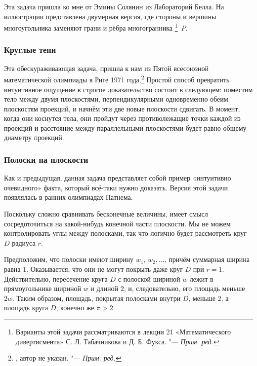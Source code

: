 \documentclass[twoside]{book}
\begin{document}
Эта задача пришла ко мне от Эмины Солянин %
из Лабораторий Белла.
На иллюстрации представлена двумерная версия, где стороны и вершины многоугольника заменяют грани и рёбра многогранника%
\footnote{Варианты этой задачи рассматриваются в лекции 21 «Математического дивертисмента» С. Л. Табачникова и Д. Б. Фукса. "--- \emph{Прим. ред.}}~$P$.

\subsubsection*{Круглые тени}%

Эта обескураживающая задача, пришла к нам из Пятой всесоюзной математической олимпиады в Риге 1971 года.\footnote{\cite[№150]{ВсМО}, автор не указан. "--- \emph{Прим. ред.}}
Простой способ превратить интуитивное ощущение в строгое доказательство состоит в следующем: поместим тело между двумя плоскостями, перпендикулярными одновременно обеим плоскостям проекций, и начнём  эти две новые плоскости сдвигать.
В  момент, когда они коснутся тела, они пройдут через противолежащие точки каждой из проекций и расстояние между параллельными плоскостями будет равно общему диаметру проекций.
\heart

\subsubsection*{Полоски на плоскости}%

Как и предыдущая, данная задача представляет собой пример «интуитивно очевидного» факта, который всё-таки нужно доказать.
Версия этой задачи появлялась в ранних олимпиадах Патнема.

\medskip

Поскольку сложно сравнивать бесконечные величины, имеет смысл сосредоточиться на какой-нибудь конечной части плоскости.
Мы не можем контролировать углы между полосками, так что логично будет рассмотреть круг $D$ радиуса $r$.

Предположим, что полоски имеют ширину $w_1$, $w_2,\dots$, причём суммарная ширина равна $1$.
Оказывается, что они не могут покрыть даже круг $D$ при $r=1$.
Действительно, пересечение круга $D$ с полоской шириной $w$ лежит в прямоугольнике шириной $w$ и длиной $2$, и, следовательно, его площадь меньше $2w$.
Таким образом, площадь, покрытая полосками внутри $D$, меньше $2$, а площадь круга $D$, конечно же $\pi>2$.
\heart 
\end{document}
